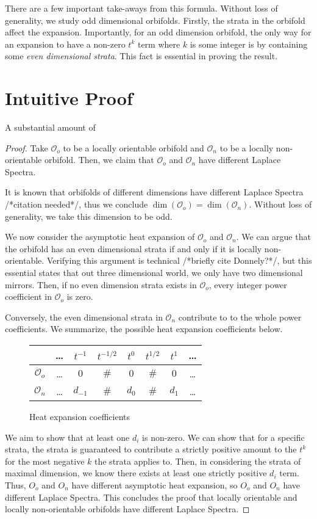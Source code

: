 \documentclass{article}[12pt]
\theoremstyle{definition}
\newcommand{\orb}{\mathcal{O}}
\begin{document}
There are a few important take-aways from this formula. 
Without loss of generality, we study odd dimensional orbifolds.
Firstly, the strata in the orbifold affect the expansion.  Importantly, for
an odd dimension orbifold, the only way for an expansion to have a non-zero
$t^{k}$ term where $k$ is some integer is by containing some \emph{even
dimensional strata}. This fact is essential in proving the result.

\section{Intuitive Proof}

A substantial amount of 

\begin{proof}

Take $\mathcal{O}_o$ to be a locally orientable orbifold and
$\mathcal{O}_n$ to be a locally non-orientable orbifold. Then, we claim
that $\mathcal{O}_o$ and $\mathcal{O}_n$ have different Laplace Spectra. 

It is known that orbifolds of different dimensions have different Laplace
Spectra /*citation needed*/, thus we conclude $\dim(\orb_o) =
\dim(\orb_n)$. Without loss of generality, we take this dimension to be
odd.

We now consider the asymptotic heat expansion of $\orb_o$ and $\orb_n$. We
can argue that the orbifold has an even dimensional strata if and only if
it is locally non-orientable. Verifying this argument is technical
/*briefly cite Donnely?*/, but
this essential states that out three dimensional world, we only have two
dimensional mirrors. Then, if no even dimension strata exists in $\orb_o$,
every integer power coefficient in $\orb_o$ is zero.

Conversely, the even dimensional strata in $\orb_n$ contribute to to the
whole power coefficients. We summarize, the possible heat expansion coefficients
below.

\begin{figure}[h]
\centering
\begin{tabular}{c | c c c c c c c}
    & \dots & $t^{-1}$ & $t^{-1/2}$ & $t^{0}$ & $t^{1/2}$ & $t^{1}$ & \dots\\
\hline
$\mathcal{O}_o$ &
    \dots & $0$ & $\#$ & $0$ & $\# $& $0$ & \dots \\
$\mathcal{O}_n$ &
\dots & $d_{-1}$ & $\#$ & $d_0$ & $\# $& $d_1$ & \dots  \\
\end{tabular}
\caption{Heat expansion coefficients}
\end{figure}
We aim to show that at least one $d_i$ is non-zero. We can show that for a
specific strata, the strata is guaranteed to contribute a strictly positive
amount to the $t^k$ for the most negative $k$ the strata applies to. Then,
in considering the strata of maximal dimension, we know there exists at
least one strictly positive $d_i$ term. Thus, $O_o$ and $O_n$ have
different asymptotic heat expansion, so $O_o$ and $O_n$ have different
Laplace Spectra. This concludes the proof that locally orientable and
locally non-orientable orbifolds have different Laplace Spectra.
\end{proof}
\end{document}

